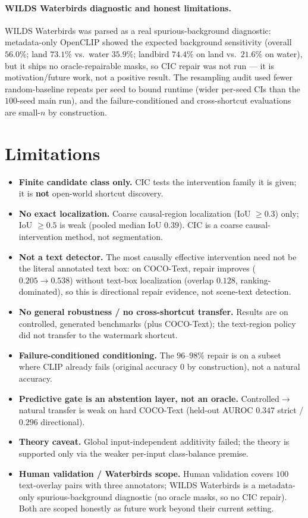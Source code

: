 \documentclass[11pt]{article}
\begin{document}
\paragraph{WILDS Waterbirds diagnostic and honest limitations.}
WILDS Waterbirds was parsed as a real spurious-background diagnostic: metadata-only
OpenCLIP showed the expected background sensitivity (overall $56.0\%$; land $73.1\%$
vs.\ water $35.9\%$; landbird $74.4\%$ on land vs.\ $21.6\%$ on water), but it ships no
oracle-repairable masks, so CIC repair was not run --- it is motivation/future work, not
a positive result. The resampling audit used fewer random-baseline repeats per seed to
bound runtime (wider per-seed CIs than the $100$-seed main run), and the
failure-conditioned and cross-shortcut evaluations are small-$n$ by construction.

\section{Limitations}\label{sec:limits}
\begin{itemize}[leftmargin=1.4em,itemsep=1pt]
\item \textbf{Finite candidate class only.} CIC tests the intervention family it is
given; it is \textbf{not} open-world shortcut discovery.
\item \textbf{No exact localization.} Coarse causal-region localization (IoU $\ge0.3$)
only; IoU $\ge0.5$ is weak (pooled median IoU $0.39$). CIC is a coarse
causal-intervention method, not segmentation.
\item \textbf{Not a text detector.} The most causally effective intervention need not
be the literal annotated text box: on COCO-Text, repair improves
($0.205\to0.538$) without text-box localization (overlap $0.128$, ranking-dominated),
so this is directional repair evidence, not scene-text detection.
\item \textbf{No general robustness / no cross-shortcut transfer.} Results are on
controlled, generated benchmarks (plus COCO-Text); the text-region policy did not
transfer to the watermark shortcut.
\item \textbf{Failure-conditioned conditioning.} The $96$--$98\%$ repair is on a subset
where CLIP already fails (original accuracy $0$ by construction), not a natural accuracy.
\item \textbf{Predictive gate is an abstention layer, not an oracle.} Controlled$\to$
natural transfer is weak on hard COCO-Text (held-out AUROC $0.347$ strict / $0.296$
directional).
\item \textbf{Theory caveat.} Global input-independent additivity failed; the theory is
supported only via the weaker per-input class-balance premise.
\item \textbf{Human validation / Waterbirds scope.} Human validation covers $100$
text-overlay pairs with three annotators; WILDS Waterbirds is a metadata-only
spurious-background diagnostic (no oracle masks, so no CIC repair). Both are scoped
honestly as future work beyond their current setting.
\end{itemize}
\end{document}
